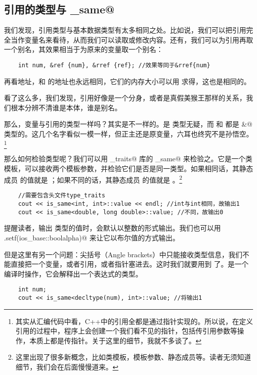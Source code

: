 \subsection*{引用的类型与 \lstinline@is_same@}
我们发现，引用类型与基本数据类型有太多相同之处。比如说，我们可以把引用完全当作变量名来看待，从而我们可以读取或修改内容。还有，我们可以为引用再取一个别名，其效果相当于为原来的变量取一个别名：
\begin{lstlisting}
    int num, &ref {num}, &rref {ref}; //效果等同于&rref{num}
\end{lstlisting}
再看地址，\lstinline@num@ 和 \lstinline@ref@ 的地址也永远相同，它们的内存大小可以用 \lstinline@sizeof@ 求得，这也是相同的。\par
看了这么多，我们发现，引用好像是一个分身，或者是真假美猴王那样的关系，我们根本分辨不清谁是本体，谁是别名。\par
那么，变量与引用的类型一样吗？其实是不一样的。\lstinline@num@ 是 \lstinline@int@ 类型无疑，而 \lstinline@ref@ 和 \lstinline@rref@ 都是 \lstinline@int&@ 类型的。这几个名字看似一模一样，但正主还是原变量，六耳也终究不是孙悟空。\footnote{其实从汇编代码中看，C++中的引用全都是通过指针实现的。所以说，在定义引用的过程中，程序上会创建一个我们看不见的指针，包括传引用参数等操作，本质上都是传指针。关于这里的细节，我就不多谈了。}\par
那么如何检验类型呢？我们可以用 \lstinline@type_traits@ 库的 \lstinline@is_same@ 来检验之。它是一个类模板，可以接收两个模板参数，并检验它们是否是同一类型。如果相同话，其静态成员 \lstinline@value@ 的值就是 \lstinline@true@；如果不同的话，其静态成员 \lstinline@value@ 的值就是 \lstinline@false@。\footnote{这里出现了很多新概念，比如类模板，模板参数、静态成员等。读者无须知道细节，我们会在后面慢慢道来。}
\begin{lstlisting}
    //需要包含头文件type_traits
    cout << is_same<int, int>::value << endl; //int与int相同，故输出1
    cout << is_same<double, long double>::value; //不同，故输出0
\end{lstlisting}
提醒读者，\lstinline@cout@ 输出 \lstinline@bool@ 类型的值时，会默认以整数的形式输出。我们也可以用 \lstinline@cout.setf(ios_base::boolalpha)@ 来让它以布尔值的方式输出。\par
但是这里有另一个问题：尖括号（Angle brackets）中只能接收类型信息，我们不能直接把一个变量，或者引用，或者指针塞进去。这时我们就要用到 \lstinline@decltype@ 了。\lstinline@decltype@ 是一个编译时操作，它会解释出一个表达式的类型。
\begin{lstlisting}
    int num;
    cout << is_same<decltype(num), int>::value; //将输出1
\end{lstlisting}
